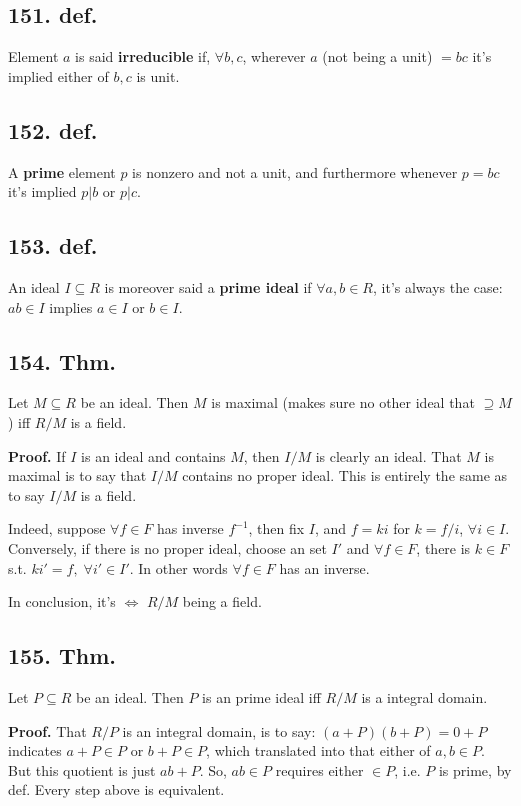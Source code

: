 \documentclass[12pt]{article}
\newcommand\Ev\forall%
\newcommand{\Eq}{\Leftrightarrow}%
\newcommand{\Ss}[1]{\textsf{\bfseries{#1}}}%
\begin{document}
\subsection*{151. def.} Element \(a\) is said \Ss{irreducible} if, \(\Ev b,c\), wherever \(a\) (not being a unit) \(=bc\) it's implied either of \(b,c\) is unit. 

\subsection*{152. def.} A \Ss{prime} element \(p\) is nonzero and not a unit, and furthermore whenever \(p=bc\) it's implied \(p|b\) or \(p|c\). 

\subsection*{153. def.} An ideal \(I \subseteq R\) is moreover said a \Ss{prime ideal} if \(\Ev a,b \in R\), it's always the case: \(ab \in I\) implies \(a \in I\) or \(b \in I\). 

\subsection*{154. Thm.} Let \(M \subseteq R\) be an ideal. 
Then \(M\) is maximal (makes sure no other ideal that \(\supseteq M\)) iff \(R/M\) is a field. \par
\Ss{Proof.} If \(I\) is an ideal and contains \(M\), then \(I/M\) is clearly an ideal. 
That \(M\) is maximal is to say that \(I/M\) contains no proper ideal. 
This is entirely the same as to say \(I/M\) is a field. \par
Indeed, suppose \(\Ev f \in F\) has inverse \(f^{-1}\), then fix \(I\), and \(f = ki\) for \(k = f/i\), \(\Ev i \in I\). 
Conversely, if there is no proper ideal, 
choose an set \(I'\) and \(\Ev f \in F\), there is \(k \in F\) s.t. \(ki' = f,\; \Ev i' \in I'\). 
In other words \(\Ev f \in F\) has an inverse. \par
In conclusion, it's \(\Eq\) \(R/M\) being a field. 

\subsection*{155. Thm.} Let \(P \subseteq R\) be an ideal. 
Then \(P\) is an prime ideal iff \(R/M\) is a integral domain. \par
\Ss{Proof.} That \(R/P\) is an integral domain, is to say: \((a+P)(b+P) = 0+P\) indicates \(a+P \in P\) or \(b+P \in P\), 
which translated into that either of \(a,b \in P\). 
But this quotient is just \(ab+P\). 
So, \(ab \in P\) requires either \(\in P\), i.e. \(P\) is prime, by def. 
Every step above is equivalent. 
\end{document}
